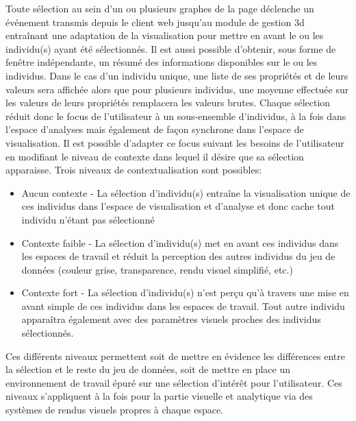 Toute sélection au sein d'un ou plusieurs graphes de la page déclenche un événement transmis depuis le client web jusqu'au module de gestion 3d entraînant une adaptation de la visualisation pour mettre en avant le ou les individu(s) ayant été sélectionnés. Il est aussi possible d'obtenir, sous forme de fenêtre indépendante, un résumé des informations disponibles sur le ou les individus. Dans le cas d'un individu unique, une liste de ses propriétés et de leurs valeurs sera affichée alors que pour plusieurs individus, une moyenne effectuée sur les valeurs de leurs propriétés remplacera les valeurs brutes.
Chaque sélection réduit donc le focus de l'utilisateur à un sous-ensemble d'individus, à la fois dans l'espace d'analyses mais également de façon synchrone dans l'espace de visualisation. Il est possible d'adapter ce focus suivant les besoins de l'utilisateur en modifiant le niveau de contexte dans lequel il désire que sa sélection apparaisse. Trois niveaux de contextualisation sont possibles:
\begin{itemize}
	\item Aucun contexte - La sélection d'individu(s) entraîne la visualisation unique de ces individus dans l'espace de visualisation et d'analyse et donc cache tout individu n'étant pas sélectionné
	\item Contexte faible - La sélection d'individu(s) met en avant ces individus dans les espaces de travail et réduit la perception des autres individus du jeu de données (couleur grise, transparence, rendu visuel simplifié, etc.)
	\item Contexte fort - La sélection d'individu(s) n'est perçu qu'à travers une mise en avant simple de ces individus dans les espaces de travail. Tout autre individu apparaîtra également avec des paramètres visuels proches des individus sélectionnés.
\end{itemize}

Ces différents niveaux permettent soit de mettre en évidence les différences entre la sélection et le reste du jeu de données, soit de mettre en place un environnement de travail épuré sur une sélection d’intérêt pour l'utilisateur. Ces niveaux s'appliquent à la fois pour la partie visuelle et analytique via des systèmes de rendus visuels propres à chaque espace.

